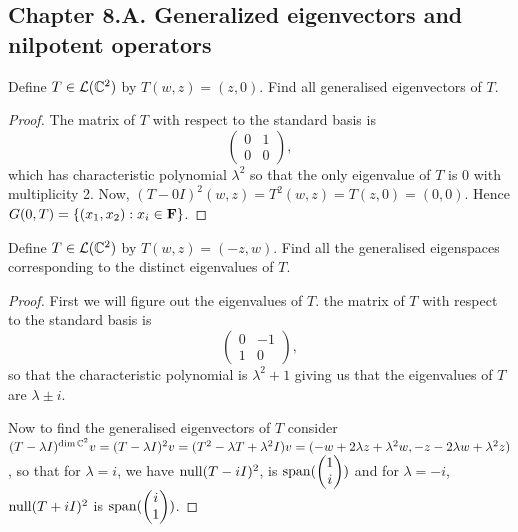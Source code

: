 \subsection*{Chapter 8.A. Generalized eigenvectors and nilpotent operators}


\begin{exercise}{1}
  Define $T\in\mathcal{L}(\mathbb{C}^2)$ by $T(w,z)=(z,0)$. Find all generalised eigenvectors of $T$.
\end{exercise}
\begin{proof}
 The matrix of $T$ with respect to the standard basis is
 \[
 \begin{pmatrix}
     0 & 1\\
     0 & 0
 \end{pmatrix},
 \]
 which has characteristic polynomial $\lambda^2$ so that the only eigenvalue of $T$ is 0 with multiplicity 2. Now, $(T-0I)^2(w,z) =T^2(w,z) =T(z,0) =(0,0)$. Hence $G(0,T)=\{(x_1,x_2):x_i\in \mathbf{F}\}$.
\end{proof}

\begin{exercise}{2}
  Define $T\in\mathcal{L}(\mathbb{C}^2)$ by $T(w,z)=(-z,w)$. Find all the generalised eigenspaces corresponding to the distinct eigenvalues of $T$.
\end{exercise}
\begin{proof}
 First we will figure out the eigenvalues of $T$. the matrix of $T$ with respect to the standard basis is
 \[
 \begin{pmatrix}
     0 & -1\\
     1 & 0
 \end{pmatrix},
 \]
 so that the characteristic polynomial is $\lambda^2+1$ giving us that the eigenvalues of $T$ are $\lambda \pm i$. 
 
 Now to find the generalised eigenvectors of $T$ consider $(T-\lambda I)^{\dim \mathbb{C}^2}v =(T-\lambda I)^2v =(T^2 -\lambda T +\lambda^2 I)v = (-w +2\lambda z+\lambda^2 w, -z-2\lambda w +\lambda^2 z)$, so that for $\lambda = i$, we have $\operatorname*{null} (T-iI)^2$, is $\operatorname*{span}(\begin{pmatrix}
     1\\
     i
 \end{pmatrix})$ and for $\lambda =-i$, $\operatorname*{null} (T+iI)^2$ is $\operatorname*{span}(\begin{pmatrix}
     i\\
     1
 \end{pmatrix})$.
\end{proof}


